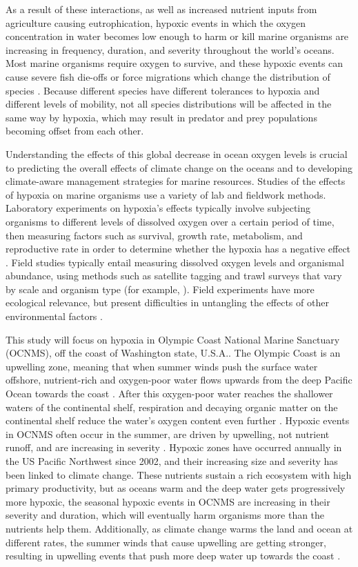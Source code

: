\documentclass[12pt,twoside]{reedthesis}
\begin{document}
As a result of these interactions, as well as increased nutrient inputs from agriculture causing eutrophication, hypoxic events in which the oxygen concentration in water becomes low enough to harm or kill marine organisms are increasing in frequency, duration, and severity throughout the world's oceans. Most marine organisms require oxygen to survive, and these hypoxic events can cause severe fish die-offs or force migrations which change the distribution of species \autocite{Pihl1991, Miller2002}. Because different species have different tolerances to hypoxia and different levels of mobility, not all species distributions will be affected in the same way by hypoxia, which may result in predator and prey populations becoming offset from each other. 

Understanding the effects of this global decrease in ocean oxygen levels is crucial to predicting the overall effects of climate change on the oceans and to developing climate-aware management strategies for marine resources. Studies of the effects of hypoxia on marine organisms use a variety of lab and fieldwork methods. Laboratory experiments on hypoxia's effects typically involve subjecting organisms to different levels of dissolved oxygen over a certain period of time, then measuring factors such as survival, growth rate, metabolism, and reproductive rate in order to determine whether the hypoxia has a negative effect \autocite{Steckbauer2020}. Field studies typically entail measuring dissolved oxygen levels and organismal abundance, using methods such as satellite tagging and trawl surveys that vary by scale and organism type (for example, \autocite{Keister2020}). Field experiments have more ecological relevance, but present difficulties in untangling the effects of other environmental factors \autocite{Borges2022, Boyd2018}. 

This study will focus on hypoxia in Olympic Coast National Marine Sanctuary (OCNMS), off the coast of Washington state, U.S.A.. The Olympic Coast is an upwelling zone, meaning that when summer winds push the surface water offshore, nutrient-rich and oxygen-poor water flows upwards from the deep Pacific Ocean towards the coast \autocite{OceanographyOlympicCoast, Hickey2003}. After this oxygen-poor water reaches the shallower waters of the continental shelf, respiration and decaying organic matter on the continental shelf reduce the water's oxygen content even further \autocite{Pierce2012}. Hypoxic events in OCNMS often occur in the summer, are driven by upwelling, not nutrient runoff, and are increasing in severity \autocite{Barth2024}. Hypoxic zones have occurred annually in the US Pacific Northwest since 2002, and their increasing size and severity has been linked to climate change. These nutrients sustain a rich ecosystem with high primary productivity, but as oceans warm and the deep water gets progressively more hypoxic, the seasonal hypoxic events in OCNMS are increasing in their severity and duration, which will eventually harm organisms more than the nutrients help them. Additionally, as climate change warms the land and ocean at different rates, the summer winds that cause upwelling are getting stronger, resulting in upwelling events that push more deep water up towards the coast \autocite{Barth2024}. 
\end{document}
